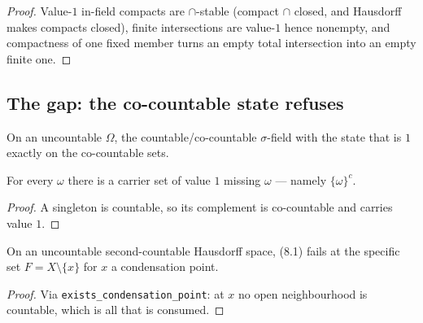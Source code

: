 \begin{proof}
  \leanok
  Value-$1$ in-field compacts are $\cap$-stable (compact $\cap$ closed, and
  Hausdorff makes compacts closed), finite intersections are value-$1$ hence
  nonempty, and compactness of one fixed member turns an empty total
  intersection into an empty finite one.
\end{proof}

\subsection{The gap: the co-countable state refuses}

\begin{definition}
  \label{def:cocountable-state}
  \leanok
  On an uncountable $\Omega$, the countable/co-countable $\sigma$-field with the
  state that is $1$ exactly on the co-countable sets.
\end{definition}

\begin{lemma}
  \label{lem:cocountable-not-dirac}
  \leanok
  For every $\omega$ there is a carrier set of value $1$ missing $\omega$ ---
  namely $\{\omega\}^{c}$.
\end{lemma}

\begin{proof}
  \leanok
  A singleton is countable, so its complement is co-countable and carries
  value $1$.
\end{proof}

\begin{theorem}
  \label{thm:cocountable-fails-81}
  \leanok
  On an uncountable second-countable Hausdorff space, (8.1) fails at the
  specific set $F = X \setminus \{x\}$ for $x$ a condensation point.
\end{theorem}

\begin{proof}
  \leanok
  Via \texttt{exists\_condensation\_point}: at $x$ no open neighbourhood is
  countable, which is all that is consumed.
\end{proof}

